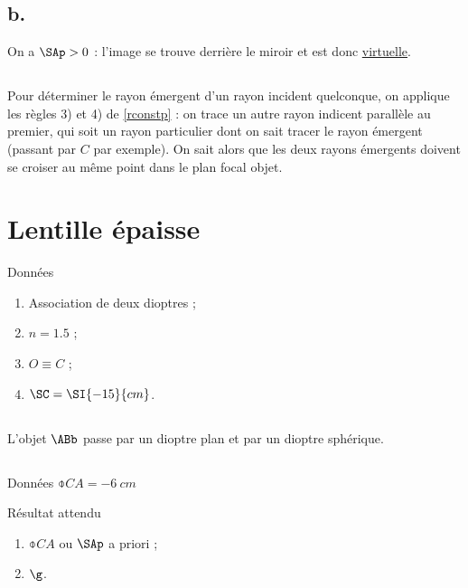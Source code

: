 \documentclass[10pt,a5paper,notitlepage]{book}
\begin{document}
\setcounter{subsection}{1}
\subsection{b.}
On a $\SAp > 0$ : l'image se trouve derrière le miroir et est donc
\underline{virtuelle}.

\subsection{}
Pour déterminer le rayon émergent d'un rayon incident quelconque, on applique
les règles 3) et 4) de \ref{rconstp} : on trace un autre rayon indicent
parallèle au premier, qui soit un rayon particulier dont on sait tracer le rayon
émergent (passant par $C$ par exemple). On sait alors que les deux rayons
émergents doivent se croiser au même point dans le plan focal objet.

\section{Lentille épaisse}
\begin{NCdefi}{Données}
    \begin{enumerate}
        \item Association de deux dioptres ;
        \item $n = 1.5$ ;
        \item $O \equiv C$ ;
        \item $\SC = \SI{-15}{cm}$.
    \end{enumerate}
\end{NCdefi}

\subsection{}
L'objet $\ABb$ passe par un dioptre plan et par un dioptre sphérique.

\subsection{}
\begin{NCdefi}{Données}
    $\obar{CA} = \SI{-6}{cm}$
\end{NCdefi}

\begin{NCprop}{Résultat attendu}
    \begin{enumerate}
        \item $\obar{CA}$ ou $\SAp$ a priori ;
        \item $\g$.
    \end{enumerate}
\end{NCprop}
\end{document}
